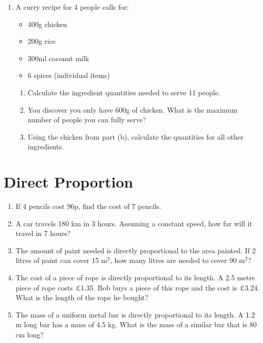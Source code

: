 \documentclass[12pt,a4paper]{article}
\begin{document}
\begin{enumerate}
\item A curry recipe for 4 people calls for:
    \begin{itemize}
    \item 400g chicken
    \item 200g rice
    \item 300ml coconut milk
    \item 6 spices (individual items)
    \end{itemize}
    \begin{enumerate}
    \item Calculate the ingredient quantities needed to serve 11 people.
    \item You discover you only have 600g of chicken. What is the maximum number of people you can fully serve?
    \item Using the chicken from part (b), calculate the quantities for all other ingredients.
    \end{enumerate}
\end{enumerate}

\newpage{}

\section*{Direct Proportion}

\begin{enumerate}
    \item If 4 pencils cost 96p, find the cost of 7 pencils.

    \item A car travels 180 km in 3 hours. Assuming a constant speed, how far will it travel in 7 hours?

    \item The amount of paint needed is directly proportional to the area painted. If 2 litres of paint can cover 15 m$^2$, how many litres are needed to cover 90 m$^2$?

    \item The cost of a piece of rope is directly proportional to its length. A 2.5 metre piece of rope costs £1.35. Bob buys a piece of this rope and the cost is £3.24. What is the length of the rope he bought?

    \item The mass of a uniform metal bar is directly proportional to its length. A 1.2 m long bar has a mass of 4.5 kg. What is the mass of a similar bar that is 80 cm long?
\end{enumerate}
\end{document}

